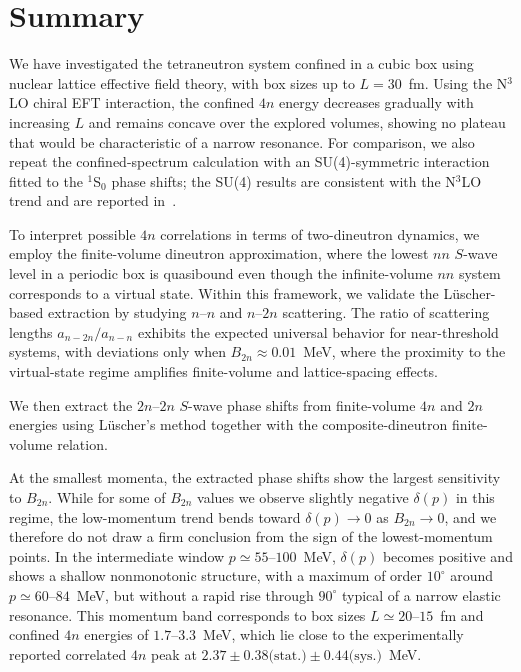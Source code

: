 \documentclass[aps,prl,showpacs,twocolumn,preprintnumbers,superscriptaddress,nofootinbib,floatfix,10pt]{revtex4-1}
\begin{document}
\section{Summary}

We have investigated the tetraneutron system confined in a cubic box using nuclear lattice effective field theory, with box sizes up to $L = 30$~fm.
Using the N$^{3}$LO chiral EFT interaction, the confined $4n$ energy decreases gradually with increasing $L$ and remains concave over the explored volumes, showing no plateau that would be characteristic of a narrow resonance.
For comparison, we also repeat the confined-spectrum calculation with an SU(4)-symmetric interaction fitted to the $^1$S$_0$ phase shifts; the SU(4) results are consistent with the N$^{3}$LO trend and are reported in~\cite{SM}.



To interpret possible $4n$ correlations in terms of two-dineutron dynamics, we employ the finite-volume dineutron approximation, where the lowest $nn$ $S$-wave level in a periodic box is quasibound even though the infinite-volume $nn$ system corresponds to a virtual state.
Within this framework, we validate the L\"uscher-based extraction by studying $n$--$n$ and $n$--$2n$ scattering.
The ratio of scattering lengths $a_{n-2n}/a_{n-n}$ exhibits the expected universal behavior for near-threshold systems, with deviations only when $B_{2n}\approx 0.01$~MeV, where the proximity to the virtual-state regime amplifies finite-volume and lattice-spacing effects.


We then extract the $2n$--$2n$ $S$-wave phase shifts from finite-volume $4n$ and $2n$ energies using L\"uscher's method together with the composite-dineutron finite-volume relation.

At the smallest momenta, the extracted phase shifts show the largest
sensitivity to $B_{2n}$. While for some of $B_{2n}$ values we observe slightly negative
$\delta(p)$ in this regime, the low-momentum trend bends toward $\delta(p)\to 0$ as
$B_{2n}\to 0$, and we therefore do not draw a firm conclusion from the
sign of the lowest-momentum points.
In the intermediate window $p\simeq 55$--$100$~MeV, $\delta(p)$ becomes positive and shows a shallow nonmonotonic structure, with a maximum of order $10^\circ$ around $p\simeq 60$--$84$~MeV, but without a rapid rise through $90^\circ$ typical of a narrow elastic resonance.
This momentum band corresponds to box sizes $L\simeq 20$--$15$~fm and confined $4n$ energies of $1.7$--$3.3$~MeV, which lie close to the experimentally reported correlated $4n$ peak at $2.37\pm0.38\text{(stat.)}\pm0.44\text{(sys.)}$~MeV.
\end{document}
